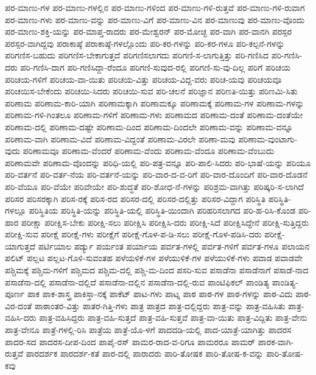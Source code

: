 {ಪರ-ಮಾಣು-ಗಳ
ಪರ-ಮಾಣು-ಗಳಲ್ಲಿನ
ಪರ-ಮಾಣು-ಗಳಿಂದ
ಪರ-ಮಾಣು-ಗಳಿ-ರುತ್ತವೆ
ಪರ-ಮಾಣು-ಗಳಿ-ರುವಾಗ
ಪರ-ಮಾಣು-ಗಳು
ಪರ-ಮಾಣು-ವನ್ನು
ಪರ-ಮಾಣು-ವಿಗೆ
ಪರ-ಮಾಣು-ವಿನ
ಪರ-ಮಾಣುವು
ಪರ-ಮಾಣು-ವೊಂದು
ಪರ-ಮಾಣು-ಶಕ್ತಿ-ಯನ್ನು
ಪರ-ಮಾಪ್ತ-ರಾದರು
ಪರ-ಮೇಶ್ವರನ್
ಪರ-ಮೋಚ್ಛ
ಪರ-ವಾಗಿ
ಪರ-ವಾನಗಿ
ಪರಸ್ಪರ
ಪರಸ್ಪರ-ವಾಗಿದ್ದವು
ಪರಾಕಾಷ್ಠೆ
ಪರಾಕಾಷ್ಠೆ-ಗಳಲ್ಲೊಂದು
ಪರಿ-ಕರ-ಗಳನ್ನು
ಪರಿ-ಕರ-ಗಳೂ
ಪರಿ-ಕಲ್ಪನೆ-ಗಳನ್ನು
ಪರಿಗಣಿಸ-ಬಹುದು
ಪರಿಗಣಿಸ-ಬೇಕಾಗುತ್ತದೆ
ಪರಿಗಣಿಸಲಾಗದು
ಪರಿಗಣಿ-ಸ-ಲಾಗುತ್ತಿತ್ತು
ಪರಿ-ಗಣಿಸಿದ
ಪರಿ-ಗಣಿಸಿ-ದರು
ಪರಿ-ಗಣಿಸಿ-ದಾಗ
ಪರಿ-ಗಣಿಸಿದ್ದಾ-ರೆಂದೂ
ಪರಿಗಣಿ-ಸುವುದ-ರಲ್ಲಿ
ಪರಿಗಣಿ-ಸು-ವು-ದಿಲ್ಲ
ಪರಿಗೆ
ಪರಿಚಯ
ಪರಿಚಯ-ಗಳಿಗೆ
ಪರಿಚಯ-ವಾ-ಯಿತು
ಪರಿಚಯ-ವಿತ್ತು
ಪರಿಚಯ-ವಿದ್ದ-ವರು
ಪರಿಚ-ಯವು
ಪರಿಚಯವೂ
ಪರಿಚಯಿಸ-ಬೇಕೆಂದು
ಪರಿಚಯಿ-ಸಿದರು
ಪರಿಚಯಿ-ಸುವ
ಪರಿ-ಚಲನೆ
ಪರಿಜ್ಞಾನ
ಪರಿಣತಿ-ಯಿತ್ತು
ಪರಿಣಮಿ-ಸಿತು
ಪರಿಣಾಮ
ಪರಿಣಾಮ-ಕಾರಿ-ಯಾಗಿ
ಪರಿಣಾಮಕ್ಕಾಗಿ
ಪರಿಣಾಮಕ್ಕೂ
ಪರಿಣಾಮಕ್ಕೆ
ಪರಿಣಾಮ-ಗಳ
ಪರಿಣಾಮ-ಗಳನ್ನು
ಪರಿಣಾಮ-ಗಳಿ-ಗಿಂತಲೂ
ಪರಿಣಾಮ-ಗಳಿಗೆ
ಪರಿಣಾಮ-ಗಳು
ಪರಿಣಾಮದ
ಪರಿಣಾಮ-ದಂತೆ
ಪರಿಣಾಮ-ದಂತೆಯೇ
ಪರಿಣಾಮ-ದಲ್ಲಿ
ಪರಿಣಾಮ-ದಷ್ಟೇ
ಪರಿಣಾಮ-ದಿಂದ
ಪರಿಣಾಮ-ದಿಂದಲೇ
ಪರಿಣಾಮ-ವನ್ನು
ಪರಿಣಾಮ-ವನ್ನೂ
ಪರಿಣಾಮ-ವಾಗಿ
ಪರಿಣಾಮ-ವಿದೆ
ಪರಿಣಾಮ-ವಿದ್ದಂತೆ
ಪರಿಣಾಮ-ವಿರಲೇ
ಪರಿಣಾ-ಮವು
ಪರಿಣಾಮ-ವುಂಟಾಗು-ವುದು
ಪರಿಣಾಮವೂ
ಪರಿಣಾಮ-ವೆಂದರೆ
ಪರಿಣಾಮ-ವೆಂದು
ಪರಿಣಾಮ-ವೆಂದೂ
ಪರಿಣಾಮ-ವೆಂಬುದು
ಪರಿಣಾಮವೇ
ಪರಿಣಾಮ-ವೊಂದನ್ನು
ಪರಿಧಿ-ಯಲ್ಲಿ
ಪರಿ-ಪತ್ರ-ವನ್ನೂ
ಪರಿ-ಪಾಲಿ-ಸಿದರು
ಪರಿ-ಭಾಷೆ-ಯನ್ನು
ಪರಿಯೂ
ಪರಿ-ವರ್ತನೆ
ಪರಿ-ವರ್ತ-ನೆಯ
ಪರಿ-ವರ್ತನೆ-ಯನ್ನು
ಪರಿ-ವಾರ-ದ-ವ-ರಿಗೆ
ಪರಿ-ವಾರ-ದೊಂದಿಗೆ
ಪರಿ-ವಾರ-ದೊಡನೆ
ಪರಿ-ವೆಯೂ
ಪರಿ-ವೆಯೇ
ಪರಿವೇಯೇ
ಪರಿ-ಶುದ್ಧತೆ
ಪರಿ-ಶೋಧ-ನೆ-ಗಳನ್ನು
ಪರಿಶ್ರಮ-ವಾಗಿತ್ತು
ಪರಿಷ್ಕರಿ-ಸ-ಲಾಗಿದೆ
ಪರಿಸರ
ಪರಿಸರಕ್ಕಾಗಿ
ಪರಿಸ-ರಕ್ಕೆ
ಪರಿಸ-ರದ
ಪರಿಸರ-ದಲ್ಲಿ
ಪರಿಸರ-ದಲ್ಲಿತ್ತು
ಪರಿಸರ-ವಿದ್ದಾಗ
ಪರಿಸ್ಥಿತಿ
ಪರಿಸ್ಥಿತಿ-ಗಳಲ್ಲೂ
ಪರಿಸ್ಥಿತಿಯ
ಪರಿಸ್ಥಿತಿ-ಯನ್ನು
ಪರಿಸ್ಥಿತಿ-ಯಲ್ಲಿ
ಪರಿಸ್ಥಿತಿ-ಯಿಂದಾಗಿ
ಪರಿಹರಿಸಲಾಗದ
ಪರಿ-ಹ-ರಿಸಿ-ಕೊಂಡ
ಪರಿ-ಹಾರ
ಪರೀಕ್ಷಾ
ಪರೀಕ್ಷಿಸ-ಬೇಕು
ಪರೀಕ್ಷಿ-ಸಲು
ಪರೀಕ್ಷಿಸಿ
ಪರೀಕ್ಷಿಸಿ-ದರು
ಪರೀಕ್ಷಿ-ಸಿದೆ
ಪರೀಕ್ಷಿಸಿದ್ದೇನೆ
ಪರೀಕ್ಷಿ-ಸುತ್ತಿದ್ದರು
ಪರೀಕ್ಷಿ-ಸುವ
ಪರೀಕ್ಷೆ
ಪರೀಕ್ಷೆ-ಗಳು
ಪರೀಕ್ಷೆಗೆ
ಪರೀಕ್ಷೆ-ಗೊಳ-ಪ-ಡಿ-ಸಲು
ಪರೀಕ್ಷೆ-ಗೊಳ-ಪಡಿಸಿ-ದರು
ಪರೀಕ್ಷೆ-ಯಾಗುತ್ತದೆ
ಪರ್ಟಿಯಾಲ
ಪರ್ಡ್ಯು
ಪರ್ಯಂತ
ಪರ್ಯಾಯ
ಪರ್ವತ-ಗಳಲ್ಲಿ
ಪರ್ವತ-ಗಳಿಗೆ
ಪರ್ವತ-ಗಳೂ
ಪಲಾಯನ
ಪಲಿಟ್
ಪಲ್ಲಟ
ಪಲ್ಲಟ-ಗೊಳಿ-ಸುವಂತಹ
ಪಳೆಯಳಿಕೆ-ಗಳ
ಪಳೆಯುಳಿಕೆ-ಗಳ
ಪಳೆಯುಳಿಕೆ-ಗಳು
ಪವಾಡ
ಪವಾಡವೇ
ಪಶ್ಚಿಮಕ್ಕೆ
ಪಶ್ಚಿಮ-ಗಳಿಗೆ
ಪಶ್ಚಿಮದ
ಪಶ್ಚಿಮ-ದಲ್ಲಿ
ಪಶ್ಚಿ-ಮ-ದಿಂದ
ಪಸರಿ-ಸುವ
ಪಸಾಡೆನಾ
ಪಸಾಡೆನಾಗೆ
ಪಸಾಡೆ-ನಾದ
ಪಸಾಡೆನಾ-ದಲ್ಲಿ
ಪಸಾಡೆನಾ-ದಲ್ಲಿದೆ
ಪಸಾಡೆನಾ-ದಲ್ಲಿನ
ಪಸಾಡೆನಾ-ದಲ್ಲಿ-ರುವ
ಪಾಂಟಿಫಿಕಲ್
ಪಾಂಡಿತ್ಯ
ಪಾಂಡಿತ್ಯ-ಪೂರ್ಣ
ಪಾಕ
ಪಾಕ-ಶಾಸ್ತ್ರ
ಪಾಕಿಸ್ತಾ-ನಕ್ಕೆ
ಪಾಕೆಟ್
ಪಾಟ-ಗಳು
ಪಾಟ್ನ
ಪಾಠ
ಪಾಠ-ಗಳ
ಪಾಠ-ಗಳನ್ನು
ಪಾಠ-ವಿದು
ಪಾಠ-ವಿರ-ದಂತೆ
ಪಾಠಾಂತರ-ವಿತ್ತು
ಪಾತರ-ಗಿತ್ತಿ-ಗಳು
ಪಾತ್ರ
ಪಾತ್ರದ
ಪಾತ್ರ-ದಲ್ಲಿದ್ದರು
ಪಾತ್ರ-ವನ್ನು
ಪಾತ್ರ-ವಹಿಸಿತು
ಪಾತ್ರ-ವಹಿಸಿ-ದರು
ಪಾತ್ರ-ವಹಿಸಿದ್ದರು
ಪಾತ್ರ-ವಹಿ-ಸುತ್ತದೆ
ಪಾತ್ರ-ವಹಿ-ಸುತ್ತವೆ
ಪಾತ್ರ-ವಾ-ಯಿತು
ಪಾತ್ರ-ವಿದ್ದಿತು
ಪಾತ್ರ-ವೇನು
ಪಾತ್ರ-ವೇನೂ
ಪಾತ್ರೆ-ಗಳಲ್ಲಿ-ರಿಸಿ
ಪಾತ್ರೆಯ
ಪಾತ್ರೆ-ಯೊ-ಳಗೆ
ಪಾದದಡಿ-ಯಲ್ಲಿ
ಪಾದ-ಯಾತ್ರೆ-ಯಾಗಿತ್ತು
ಪಾದರಸ
ಪಾದರ-ಸದ
ಪಾದರಸ-ದೀಪ-ದಿಂದ
ಪಾಪೈ-ರಸ್
ಪಾಮರ-ರಾದ-ವ-ರಿಗೂ
ಪಾಮರರೂ
ಪಾಮರ್
ಪಾರಕ-ವಾಗಿ-ರುತ್ತವೆ
ಪಾರದರ್ಶಕ
ಪಾರದರ್ಶ-ಕತೆ
ಪಾರ-ದಲ್ಲಿ
ಪಾರಾದರು
ಪಾರಿ-ತೋಷಕ
ಪಾರಿ-ತೋಷ-ಕ-ವನ್ನು
ಪಾರಿ-ತೋಷ-ಕವು
}
